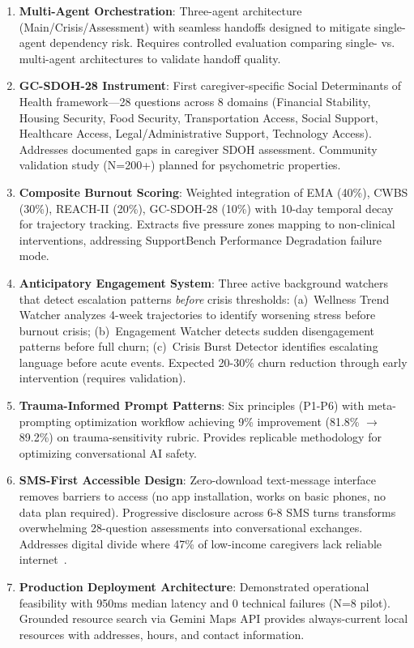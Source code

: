 \documentclass{article}
\begin{document}
\begin{enumerate}
    \item \textbf{Multi-Agent Orchestration}: Three-agent architecture (Main/Crisis/Assessment) with seamless handoffs designed to mitigate single-agent dependency risk. Requires controlled evaluation comparing single- vs. multi-agent architectures to validate handoff quality.

    \item \textbf{GC-SDOH-28 Instrument}: First caregiver-specific Social Determinants of Health framework—28 questions across 8 domains (Financial Stability, Housing Security, Food Security, Transportation Access, Social Support, Healthcare Access, Legal/Administrative Support, Technology Access). Addresses documented gaps in caregiver SDOH assessment. Community validation study (N=200+) planned for psychometric properties.

    \item \textbf{Composite Burnout Scoring}: Weighted integration of EMA (40\%), CWBS (30\%), REACH-II (20\%), GC-SDOH-28 (10\%) with 10-day temporal decay for trajectory tracking. Extracts five pressure zones mapping to non-clinical interventions, addressing SupportBench Performance Degradation failure mode.

    \item \textbf{Anticipatory Engagement System}: Three active background watchers that detect escalation patterns \textit{before} crisis thresholds: (a)~Wellness Trend Watcher analyzes 4-week trajectories to identify worsening stress before burnout crisis; (b)~Engagement Watcher detects sudden disengagement patterns before full churn; (c)~Crisis Burst Detector identifies escalating language before acute events. Expected 20-30\% churn reduction through early intervention (requires validation).

    \item \textbf{Trauma-Informed Prompt Patterns}: Six principles (P1-P6) with meta-prompting optimization workflow achieving 9\% improvement (81.8\% $\rightarrow$ 89.2\%) on trauma-sensitivity rubric. Provides replicable methodology for optimizing conversational AI safety.

    \item \textbf{SMS-First Accessible Design}: Zero-download text-message interface removes barriers to access (no app installation, works on basic phones, no data plan required). Progressive disclosure across 6-8 SMS turns transforms overwhelming 28-question assessments into conversational exchanges. Addresses digital divide where 47\% of low-income caregivers lack reliable internet~\cite{aarp2025}.

    \item \textbf{Production Deployment Architecture}: Demonstrated operational feasibility with 950ms median latency and 0 technical failures (N=8 pilot). Grounded resource search via Gemini Maps API provides always-current local resources with addresses, hours, and contact information.
\end{enumerate}
\end{document}
